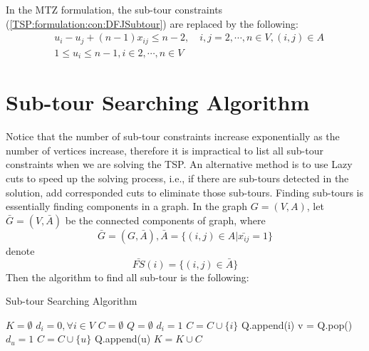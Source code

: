 				In the MTZ formulation, the sub-tour constraints (\ref{TSP:formulation:con:DFJSubtour}) are replaced by the following:
				\begin{align}
					&u_i - u_j + (n - 1) x_{ij} \le n - 2, \quad i, j = 2, \cdots, n \in V, (i, j) \in A\\
					&1 \le u_i \le n - 1, i \in 2, \cdots, n \in V
				\end{align}


			\section{Sub-tour Searching Algorithm}
				Notice that the number of sub-tour constraints increase exponentially as the number of vertices increase, therefore it is impractical to list all sub-tour constraints when we are solving the TSP. An alternative method is to use Lazy cuts to speed up the solving process, i.e., if there are sub-tours detected in the solution, add corresponded cuts to eliminate those sub-tours. Finding sub-tours is essentially finding components in a graph. In the graph $G=(V, A)$, let $\bar{G}=(V, \bar{A})$ be the connected components of graph, where
				\begin{equation}
					\bar{G}=(G, \bar{A}), \bar{A}=\{(i, j) \in A | \bar{x_{ij}}=1\}
				\end{equation}
				denote
				\begin{equation}
					\bar{FS}(i) = \{(i,j)\in \bar{A}\}
				\end{equation}
				Then the algorithm to find all sub-tour is the following:
				\begin{algorithm}[!ht]
					\caption{Sub-tour Searching Algorithm}
					\begin{algorithmic}[1]
						\State $K = \emptyset$
						\State $d_i = 0, \forall i \in V$
							\State $C = \emptyset$
							\State $Q = \emptyset$
								\State $d_i = 1$
								\State $C = C\cup \{i\}$
								\State Q.append(i)
									\State v = Q.pop()
											\State $d_u = 1$
											\State $C = C \cup \{u\}$
											\State Q.append(u)
										\EndIf
									\EndFor
								\EndWhile
							\EndIf
							\State $K=K\cup C$
						\EndFor
					\end{algorithmic}
				\end{algorithm}

